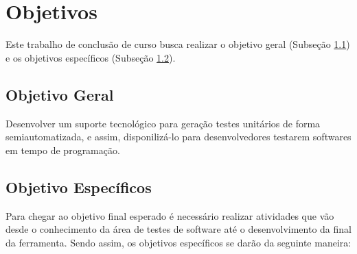 
\section[Objetivos]{Objetivos}
\label{objetivos}

Este trabalho de conclusão de curso busca realizar o objetivo geral (Subseção \ref{objetivo_geral}) e os objetivos específicos  (Subseção \ref{objetivos_especificos}).

\subsection[Objetivo Geral]{Objetivo Geral}
\label{objetivo_geral}

Desenvolver um suporte tecnológico para geração testes unitários de forma semiautomatizada, e assim, disponilizá-lo para desenvolvedores testarem softwares em tempo de programação.

\subsection[Objetivos Específicos]{Objetivo Específicos}
\label{objetivos_especificos}
Para chegar ao objetivo final esperado é necessário realizar atividades que vão desde o conhecimento da área de testes de software até o desenvolvimento da final da ferramenta. Sendo assim, os objetivos específicos se darão da seguinte maneira:

